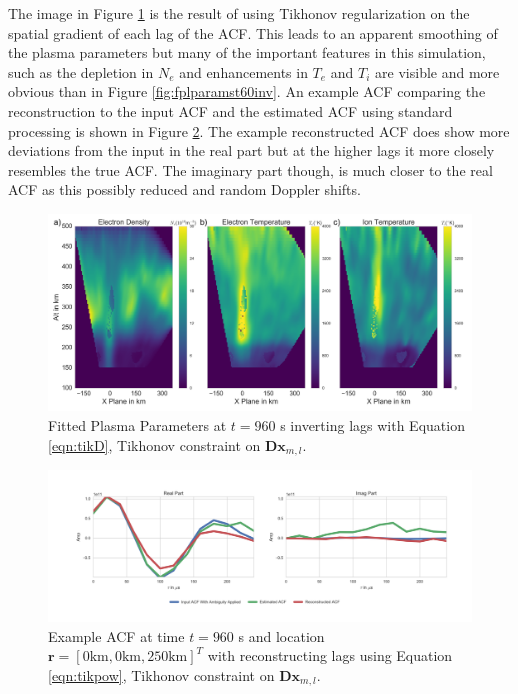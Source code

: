 The image in Figure \ref{fig:tikD} is the result of using Tikhonov regularization on the spatial gradient of each lag of the ACF. This leads to an apparent smoothing of the plasma parameters but many of the important features in this simulation, such as the depletion in $N_e$ and enhancements in $T_e$ and $T_i$ are visible and more obvious than in Figure \ref{fig:fplparamst60inv}. An example ACF comparing the reconstruction to the input ACF and the estimated ACF using standard processing is shown in Figure \ref{fig:tikDacf}. The example reconstructed ACF does show more deviations from the input in the real part but at the higher lags it more closely resembles the true ACF. The imaginary part though, is much closer to the real ACF as this possibly reduced and random Doppler shifts.
\begin{figure}[!ht]
\centering
\includegraphics[width=6in]{tikdfitted}
\caption{Fitted Plasma Parameters at $t=960$ s inverting lags with Equation \ref{eqn:tikD}, Tikhonov constraint on $\mathbf{Dx}_{m,l}$. }
\label{fig:tikD}
\end{figure}

\begin{figure}[!ht]
\centering
\includegraphics[width=6in]{acftikd}
\caption{Example ACF at time $t=960$ s and location $\mathbf{r}=[0  \text{km},0  \text{km},250 \text{km}]^T$ with reconstructing lags using Equation \ref{eqn:tikpow}, Tikhonov constraint on $\mathbf{Dx}_{m,l}$. }
\label{fig:tikDacf}
\end{figure}

